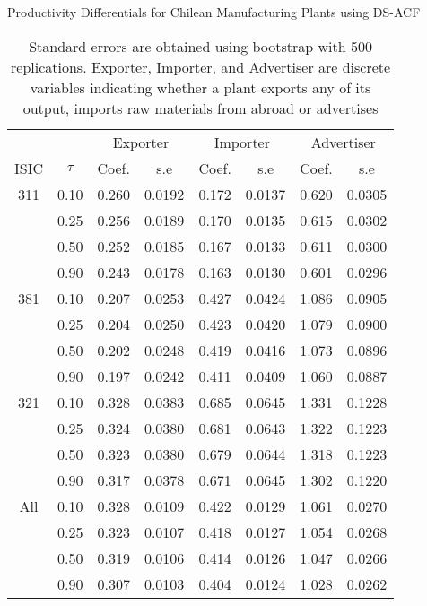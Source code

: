 \documentclass[11pt]{article}
\begin{document}
\begin{table}[H]
\centering
\caption{Productivity Differentials for Chilean Manufacturing Plants using DS-ACF}
\begin{tabular}{cccccccc}
  \hline\hline & & \multicolumn{2}{c}{Exporter}  & \multicolumn{2}{c}{Importer} & \multicolumn{2}{c}{Advertiser} \\ \cmidrule(lr){3-4} \cmidrule(lr){5-6} \cmidrule(lr){7-8}ISIC & $\tau$ & Coef. & s.e & Coef. & s.e & Coef. & s.e \\ 
  \hline
311 & 0.10 & 0.260 & 0.0192 & 0.172 & 0.0137 & 0.620 & 0.0305 \\ 
   & 0.25 & 0.256 & 0.0189 & 0.170 & 0.0135 & 0.615 & 0.0302 \\ 
   & 0.50 & 0.252 & 0.0185 & 0.167 & 0.0133 & 0.611 & 0.0300 \\ 
   & 0.90 & 0.243 & 0.0178 & 0.163 & 0.0130 & 0.601 & 0.0296 \\ 
  381 & 0.10 & 0.207 & 0.0253 & 0.427 & 0.0424 & 1.086 & 0.0905 \\ 
   & 0.25 & 0.204 & 0.0250 & 0.423 & 0.0420 & 1.079 & 0.0900 \\ 
   & 0.50 & 0.202 & 0.0248 & 0.419 & 0.0416 & 1.073 & 0.0896 \\ 
   & 0.90 & 0.197 & 0.0242 & 0.411 & 0.0409 & 1.060 & 0.0887 \\ 
  321 & 0.10 & 0.328 & 0.0383 & 0.685 & 0.0645 & 1.331 & 0.1228 \\ 
   & 0.25 & 0.324 & 0.0380 & 0.681 & 0.0643 & 1.322 & 0.1223 \\ 
   & 0.50 & 0.323 & 0.0380 & 0.679 & 0.0644 & 1.318 & 0.1223 \\ 
   & 0.90 & 0.317 & 0.0378 & 0.671 & 0.0645 & 1.302 & 0.1220 \\ 
  All & 0.10 & 0.328 & 0.0109 & 0.422 & 0.0129 & 1.061 & 0.0270 \\ 
   & 0.25 & 0.323 & 0.0107 & 0.418 & 0.0127 & 1.054 & 0.0268 \\ 
   & 0.50 & 0.319 & 0.0106 & 0.414 & 0.0126 & 1.047 & 0.0266 \\ 
   & 0.90 & 0.307 & 0.0103 & 0.404 & 0.0124 & 1.028 & 0.0262 \\ 
   \hline
\end{tabular}
\caption*{Standard errors are obtained using bootstrap with 500 replications. Exporter, Importer, and Advertiser are discrete variables indicating whether a plant exports any of its output, imports raw materials from abroad or advertises}
\end{table}
\end{document}
